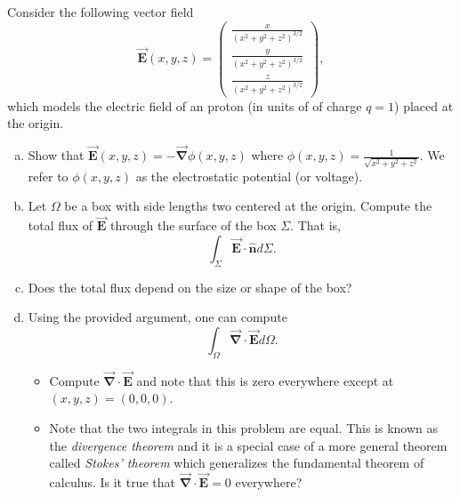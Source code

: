 \documentclass[12pt]{article} %
\newcommand{\grad}{\boldsymbol{\vec{\nabla}}}
\newcommand{\vecfieldE}{\boldsymbol{\vec{E}}}
\newcommand{\unitvec}{\boldsymbol{\hat{n}}}
\begin{document}
\begin{problem}
Consider the following vector field
\[
\vecfieldE(x,y,z) = \begin{pmatrix} \frac{x}{(x^2+y^2+z^2)^{3/2}} \\ \frac{y}{(x^2+y^2+z^2)^{3/2}} \\ \frac{z}{(x^2+y^2+z^2)^{3/2}} \end{pmatrix},
\]
which models the electric field of an proton (in units of of charge $q=1$) placed at the origin.
\begin{enumerate}[(a)]
	\item Show that $\vecfieldE(x,y,z) = - \grad \phi(x,y,z)$ where $\phi(x,y,z) = \frac{1}{\sqrt{x^2+y^2+z^2}}$.  We refer to $\phi(x,y,z)$ as the electrostatic potential (or voltage).
	\item Let $\Omega$ be a box with side lengths two centered at the origin.  Compute the total flux of $\vecfieldE$ through the surface of the box $\Sigma$. That is,
	\[
	\int_\Sigma \vecfieldE \cdot \unitvec d\Sigma.
	\]
	\item Does the total flux depend on the size or shape of the box?
	\item Using the provided argument, one can compute
	\[
	\int_\Omega \grad \cdot \vecfieldE d\Omega.
	\]
	\begin{itemize}
		\item Compute $\grad \cdot \vecfieldE$ and note that this is zero everywhere except at $(x,y,z)=(0,0,0)$.
		\item Note that the two integrals in this problem are equal. This is known as the \emph{divergence theorem} and it is a special case of a more general theorem called \emph{Stokes' theorem} which generalizes the fundamental theorem of calculus. Is it true that $\grad \cdot \vecfieldE = 0$ everywhere?
	\end{itemize}
\end{enumerate}
\end{problem}
\end{document}
